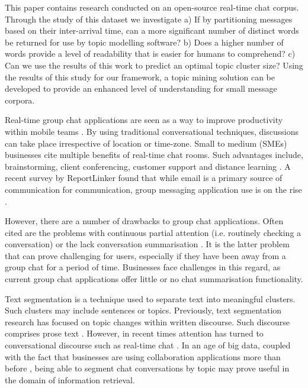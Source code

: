 This paper contains research conducted on an open-source real-time chat corpus. Through the study of this dataset we investigate a) If by partitioning messages based on their inter-arrival time, can a more significant number of distinct words be returned for use by topic modelling software? b) Does a higher number of words provide a level of readability that is easier for humans to comprehend? c) Can we use the results of this work to predict an optimal topic cluster size? Using the results of this study for our framework, a topic mining solution can be developed to provide an enhanced level of understanding for small message corpora.


Real-time group chat applications are seen as a way to improve productivity within mobile teams \cite{mobilesix}. By using traditional conversational techniques, discussions can take place irrespective of location or time-zone.  Small to medium (SMEs) businesses cite multiple benefits of real-time chat rooms. Such advantages include, brainstorming, client conferencing, customer support and distance learning \cite{smallbizchat}. A recent survey by ReportLinker found that while email is a primary source of communication for communication, group messaging application use is on the rise \cite{replink}. 

However, there are a number of drawbacks to group chat applications. Often cited are the problems with continuous partial attention (i.e. routinely checking a conversation) \cite{procon} or the lack conversation summarisation \cite{chatsweat}. It is the latter problem that can prove challenging for users, especially if they have been away from a group chat for a period of time. Businesses face challenges in this regard, as current group chat applications offer little or no chat summarisation functionality. 

Text segmentation is a technique used to separate text into meaningful clusters. Such clusters may include sentences or topics. Previously, text segmentation research has focused on topic changes within written discourse. Such discourse comprises prose text \cite{likforman2007text}. However, in recent times attention has turned to conversational discourse such as real-time chat \cite{weisz2008segmentation}. In an age of big data, coupled with the fact that businesses are using collaboration applications more than before \cite{chatrise}, being able to segment chat conversations by topic may prove useful in the domain of information retrieval.

